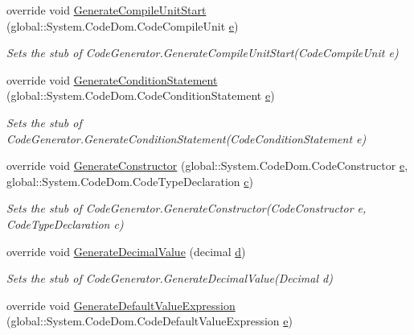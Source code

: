 \begin{DoxyCompactItemize}
override void \hyperlink{class_system_1_1_code_dom_1_1_compiler_1_1_fakes_1_1_stub_code_generator_a84e4ad1fabee292a152068a66b1e9624}{Generate\-Compile\-Unit\-Start} (global\-::\-System.\-Code\-Dom.\-Code\-Compile\-Unit \hyperlink{jquery-1_810_82_8min_8js_a2c038346d47955cbe2cb91e338edd7e1}{e})
\begin{DoxyCompactList}\small\item\em Sets the stub of Code\-Generator.\-Generate\-Compile\-Unit\-Start(\-Code\-Compile\-Unit e)\end{DoxyCompactList}\item 
override void \hyperlink{class_system_1_1_code_dom_1_1_compiler_1_1_fakes_1_1_stub_code_generator_a9171f823bd83b47e8d67d4a13a9967cf}{Generate\-Condition\-Statement} (global\-::\-System.\-Code\-Dom.\-Code\-Condition\-Statement \hyperlink{jquery-1_810_82_8min_8js_a2c038346d47955cbe2cb91e338edd7e1}{e})
\begin{DoxyCompactList}\small\item\em Sets the stub of Code\-Generator.\-Generate\-Condition\-Statement(\-Code\-Condition\-Statement e)\end{DoxyCompactList}\item 
override void \hyperlink{class_system_1_1_code_dom_1_1_compiler_1_1_fakes_1_1_stub_code_generator_aea21f4ff8752614a94ed6e9f67a306b6}{Generate\-Constructor} (global\-::\-System.\-Code\-Dom.\-Code\-Constructor \hyperlink{jquery-1_810_82_8min_8js_a2c038346d47955cbe2cb91e338edd7e1}{e}, global\-::\-System.\-Code\-Dom.\-Code\-Type\-Declaration \hyperlink{bootstrap_8min_8js_abce695e0af988ece0826d9ad59b8160d}{c})
\begin{DoxyCompactList}\small\item\em Sets the stub of Code\-Generator.\-Generate\-Constructor(\-Code\-Constructor e, Code\-Type\-Declaration c)\end{DoxyCompactList}\item 
override void \hyperlink{class_system_1_1_code_dom_1_1_compiler_1_1_fakes_1_1_stub_code_generator_a278285dcbd4ec3fdfd7de45ed4c7bc34}{Generate\-Decimal\-Value} (decimal \hyperlink{bootstrap_8min_8js_aeb337d295abaddb5ec3cb34cc2e2bbc9}{d})
\begin{DoxyCompactList}\small\item\em Sets the stub of Code\-Generator.\-Generate\-Decimal\-Value(\-Decimal d)\end{DoxyCompactList}\item 
override void \hyperlink{class_system_1_1_code_dom_1_1_compiler_1_1_fakes_1_1_stub_code_generator_ac3a5bb0823355e839a33bd63dccaaed0}{Generate\-Default\-Value\-Expression} (global\-::\-System.\-Code\-Dom.\-Code\-Default\-Value\-Expression \hyperlink{jquery-1_810_82_8min_8js_a2c038346d47955cbe2cb91e338edd7e1}{e})

\end{DoxyCompactItemize}

